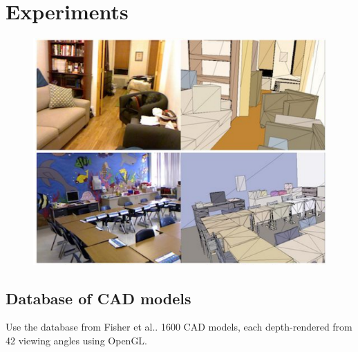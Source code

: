 \documentclass[10pt,a4paper, twocolumn]{article}
\makeatletter
\newcommand*{\ea}{et al.\@\xspace}
\newcommand{\prob}{Pr}
\newcommand{\rgbdimage}{\mathbf{I}}
\newcommand{\imregion}{\mathcal{R}}
\makeatother
\begin{document}



\section{Experiments}


\begin{figure}
	\centering%
	\includegraphics[width=1.0\columnwidth]{guo.png}%
	\label{fig:guo_labels}%
\end{figure}



\subsection{Database of CAD models}
Use the database from Fisher \ea \cite{fisher-siggraphasia-2012}.
1600 CAD models, each depth-rendered from 42 viewing angles using OpenGL.
\end{document}

